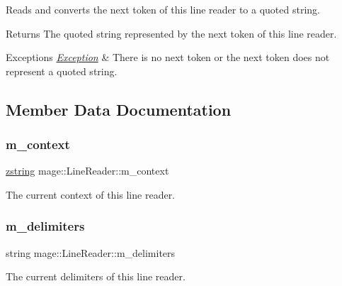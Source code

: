 Reads and converts the next token of this line reader to a quoted string.

\begin{DoxyReturn}{Returns}
The quoted string represented by the next token of this line reader. 
\end{DoxyReturn}

\begin{DoxyExceptions}{Exceptions}
{\em \mbox{\hyperlink{classmage_1_1_exception}{Exception}}} & There is no next token or the next token does not represent a quoted string. \\
\hline
\end{DoxyExceptions}


\subsection{Member Data Documentation}
\mbox{\label{classmage_1_1_line_reader_ae1f715152d14188cc490870e307099d8}} 
\subsubsection{\texorpdfstring{m\+\_\+context}{m\_context}}
{\footnotesize\ttfamily \mbox{\hyperlink{namespacemage_a4163ec9a9a27d5e7f4b452dcb99cb2b9}{zstring}} mage\+::\+Line\+Reader\+::m\+\_\+context\hspace{0.3cm}{\ttfamily [protected]}}

The current context of this line reader. \mbox{\label{classmage_1_1_line_reader_a6de3398ac59fdd98f8c40cff6f5c1075}} 
\subsubsection{\texorpdfstring{m\+\_\+delimiters}{m\_delimiters}}
{\footnotesize\ttfamily string mage\+::\+Line\+Reader\+::m\+\_\+delimiters\hspace{0.3cm}{\ttfamily [private]}}

The current delimiters of this line reader. \mbox{\label{classmage_1_1_line_reader_a510ff5355c6d26d7c29dc692ef18a3e2}} 
